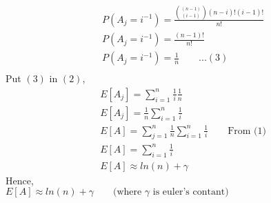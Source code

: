 \documentclass[12pt]{article}
\begin{document}
\begin{solution}
        \\
        \begin{align*}
            &P(A_j=i^{-1})=\frac{{{(n-1)}\choose{(i-1)}} (n-i)!(i-1)!}{n!}\\
            &P(A_j=i^{-1})=\frac{(n-1)!}{n!}\\
            &P(A_j=i^{-1})=\frac{1}{n}\quad\quad...(3)\\
        \end{align*}
        Put $(3)$ in $(2)$,\\
        \begin{align*}
            &E[A_j]=\sum_{i=1}^{n}\frac{1}{i}\frac{1}{n}\\
            &E[A_j]=\frac{1}{n}\sum_{i=1}^{n}\frac{1}{i}\\
            &E[A]=\sum_{j=1}^{n}\frac{1}{n}\sum_{i=1}^{n}\frac{1}{i}\quad\quad\text{From ($1$)}\\
            &E[A]=\sum_{i=1}^{n}\frac{1}{i}\\
            &E[A]\approx ln(n) + \gamma
        \end{align*} 
        Hence,\\
        $E[A]\approx ln(n) + \gamma \quad\quad\text{(where $\gamma$ is euler's contant)}$
        
    \end{solution}
\end{document}

